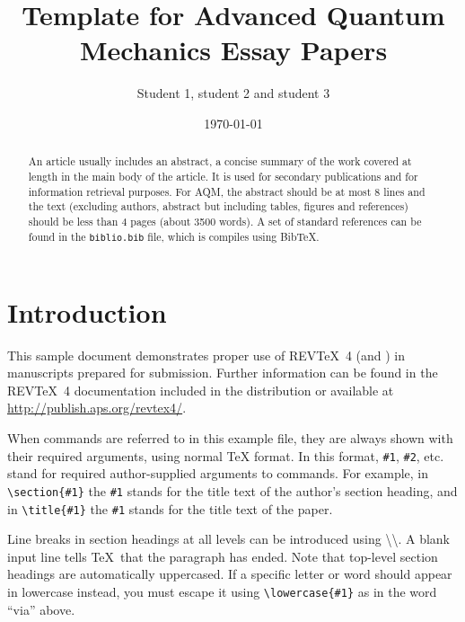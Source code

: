 \documentclass[aps,prl,twocolumn,superscriptaddress,groupedaddress]{revtex4}  %
\begin{document}
\title{Template for Advanced Quantum Mechanics Essay Papers}

\date{\today}

\author{Student 1, student 2 and student 3}

\begin{abstract}
An article usually includes an abstract, a concise summary of the work
covered at length in the main body of the article. It is used for
secondary publications and for information retrieval purposes.
For AQM, the abstract should be at most 8 lines and the text
 (excluding authors, abstract but including tables,
figures and references) should be less than 4 pages (about 3500 words).
A set of standard references can be found in the 
\verb+biblio.bib+ file, which is compiles using BibTeX.
\end{abstract}
\maketitle

\section{\label{sec:level1}Introduction}

This sample document demonstrates proper use of REV\TeX~4 (and
\LaTeXe) in manuscripts prepared for submission.
 Further information can be found in the REV\TeX~4
documentation included in the distribution or available at
\url{http://publish.aps.org/revtex4/}.

When commands are referred to in this example file, they are always
shown with their required arguments, using normal \TeX{} format. In
this format, \verb+#1+, \verb+#2+, etc. stand for required
author-supplied arguments to commands. For example, in
\verb+\section{#1}+ the \verb+#1+ stands for the title text of the
author's section heading, and in \verb+\title{#1}+ the \verb+#1+
stands for the title text of the paper.

Line breaks in section headings at all levels can be introduced using
\textbackslash\textbackslash. A blank input line tells \TeX\ that the
paragraph has ended. Note that top-level section headings are
automatically uppercased. If a specific letter or word should appear in
lowercase instead, you must escape it using \verb+\lowercase{#1}+ as
in the word ``via'' above.
\end{document}

